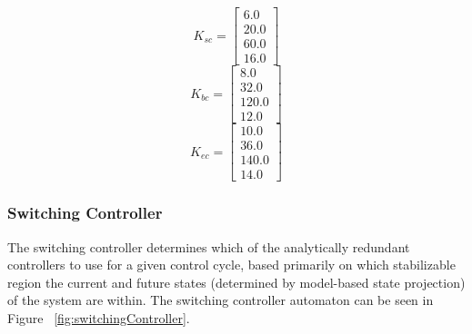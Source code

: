 \documentclass[conference]{IEEEtran}
\begin{document}
\begin{equation}
K_{sc}=\left[\begin{array}{c}6.0\\ 20.0\\ 60.0\\ 16.0\end{array}\right]
\end{equation}
\begin{equation}
K_{bc}=\left[\begin{array}{c}8.0\\ 32.0\\ 120.0\\ 12.0\end{array}\right]
\end{equation}
\begin{equation}
K_{ec}=\left[\begin{array}{c}10.0\\ 36.0\\ 140.0\\ 14.0\end{array}\right]
\end{equation}

%
%
%

\subsubsection{Switching Controller}
The switching controller determines which of the analytically redundant controllers to use for a given control cycle, based primarily on which stabilizable region the current and future states (determined by model-based state projection) of the system are within.  The switching controller automaton can be seen in Figure ~\ref{fig:switchingController}.
\end{document}

